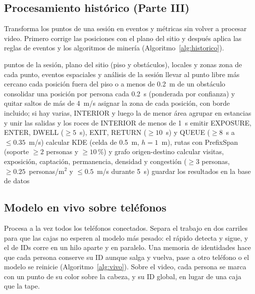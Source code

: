 \documentclass[12pt,a4paper]{article}
\begin{document}
\subsection{Procesamiento histórico (Parte III)}

Transforma los puntos de una sesión en eventos y métricas sin volver a procesar
video. Primero corrige las posiciones con el plano del sitio y después aplica
las reglas de eventos y los algoritmos de minería (Algoritmo~\ref{alg:historico}).

\begin{algorithm}[H]
\caption{Procesamiento histórico}
\label{alg:historico}
\begin{algorithmic}[1]
\REQUIRE puntos de la sesión, plano del sitio (piso y obstáculos), locales y zonas
\ENSURE zona de cada punto, eventos espaciales y análisis de la sesión
\STATE llevar al punto libre más cercano cada posición fuera del piso o a menos de 0.2~m de un obstáculo
\STATE consolidar una posición por persona cada 0.2~s (ponderada por confianza) y quitar saltos de más de 4~m/s
\STATE asignar la zona de cada posición, con borde incluido; si hay varias, INTERIOR y luego la de menor área
\STATE agrupar en estancias y unir las salidas y los roces de INTERIOR de menos de 1~s
  \STATE emitir EXPOSURE, ENTER, DWELL ($\geq 5$~s), EXIT, RETURN ($\geq 10$~s) y QUEUE ($\geq 8$~s a $\leq 0.35$~m/s)
\ENDFOR
\STATE calcular KDE (celda de 0.5~m, $h = 1$~m), rutas con PrefixSpan (soporte $\geq 2$ personas y $\geq 10\,\%$) y grafo origen-destino
\STATE calcular visitas, exposición, captación, permanencia, densidad y congestión ($\geq 3$ personas, $\geq 0.25$~personas/m$^2$ y $\leq 0.5$~m/s durante 5~s)
\STATE guardar los resultados en la base de datos
\end{algorithmic}
\end{algorithm}

\subsection{Modelo en vivo sobre teléfonos}

Procesa a la vez todos los teléfonos conectados. Separa el trabajo en dos carriles para que las cajas no esperen al modelo más pesado: el rápido detecta y sigue, y el de IDs corre en un hilo aparte y en paralelo.
Una memoria de identidades hace que cada persona conserve su ID aunque salga
y vuelva, pase a otro teléfono o el modelo se reinicie
(Algoritmo~\ref{alg:vivo}). Sobre el video, cada persona se marca con un
punto de su color sobre la cabeza, y su ID global, en lugar de una caja que la tape.
\end{document}
